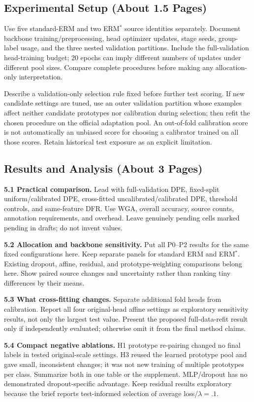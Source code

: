 \documentclass[runningheads]{llncs}
\begin{document}
\subsection{Experimental Setup (About 1.5 Pages)}
Use five standard-ERM and two ERM$^*$ source identities separately. Document backbone training/preprocessing, head optimizer updates, stage seeds, group-label usage, and the three nested validation partitions. Include the full-validation head-training budget; 20 epochs can imply different numbers of updates under different pool sizes. Compare complete procedures before making any allocation-only interpretation.

Describe a validation-only selection rule fixed before further test scoring. If new candidate settings are tuned, use an outer validation partition whose examples affect neither candidate prototypes nor calibration during selection; then refit the chosen procedure on the official adaptation pool. An out-of-fold calibration score is not automatically an unbiased score for choosing a calibrator trained on all those scores. Retain historical test exposure as an explicit limitation.

\subsection{Results and Analysis (About 3 Pages)}
\textbf{5.1 Practical comparison.} Lead with full-validation DPE, fixed-split uniform/calibrated DPE, cross-fitted uncalibrated/calibrated DPE, threshold controls, and same-feature DFR. Use WGA, overall accuracy, source counts, annotation requirements, and overhead. Leave genuinely pending cells marked pending in drafts; do not invent values.

\textbf{5.2 Allocation and backbone sensitivity.} Put all P0--P2 results for the same fixed configurations here. Keep separate panels for standard ERM and ERM$^*$. Existing dropout, affine, residual, and prototype-weighting comparisons belong here. Show paired source changes and uncertainty rather than ranking tiny differences by their means.

\textbf{5.3 What cross-fitting changes.} Separate additional fold heads from calibration. Report all four original-head affine settings as exploratory sensitivity results, not only the largest test value. Present the proposed full-data-refit result only if independently evaluated; otherwise omit it from the final method claims.

\textbf{5.4 Compact negative ablations.} H1 prototype re-pairing changed no final labels in tested original-scale settings. H3 reused the learned prototype pool and gave small, inconsistent changes; it was not new training of multiple prototypes per class. Summarize both in one table or the supplement. MLP/dropout has no demonstrated dropout-specific advantage. Keep residual results exploratory because the brief reports test-informed selection of average loss/$\lambda=.1$.
\end{document}
